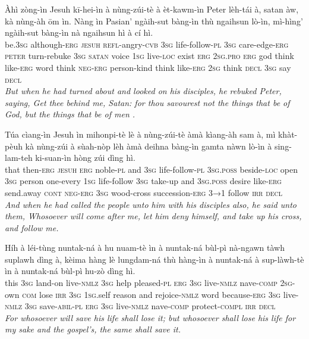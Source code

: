 \documentclass[11pt,a4paper]{article}
\begin{document}
\begin{exe}
\gll Àhì zòng-ìn Jesuh kī-hei-ìn à nùng-zúi-tè à èt-kawm-ìn Peter lèh-tái à, satan àw, kà nùng-àh ōm ìn. Nàng ìn Pasian' ngàih-sut bàng-ìn thù ngaihsun lò-ìn, mì-hìng' ngàih-sut bàng-ìn nà ngaihsun hì à cí hì. \\
     be.\textsc{3sg} although-\textsc{erg} \textsc{jesuh} \textsc{refl}-angry-\textsc{cvb} \textsc{3sg} life-follow-\textsc{pl} \textsc{3sg} care-edge-\textsc{erg} \textsc{peter} turn-rebuke \textsc{3sg} \textsc{satan} voice \textsc{1sg} live-\textsc{loc} exist \textsc{erg} \textsc{2sg}.\textsc{pro} \textsc{erg} god think like-\textsc{erg} word think \textsc{neg}-\textsc{erg} person-kind think like-\textsc{erg} \textsc{2sg} think \textsc{decl} \textsc{3sg} say \textsc{decl} \\
\glt \textcolor{kjvcolor}{\textit{But when he had turned about and looked on his disciples, he rebuked Peter, saying, Get thee behind me, Satan: for thou savourest not the things that be of God, but the things that be of men .}}

\gll Túa cìang-ìn Jesuh ìn mihonpi-tè lè à nùng-zúi-tè àmà kìang-àh sam à, mì khàt-pèuh kà nùng-zúi à sùah-nòp lèh àmà deihna bàng-ìn gamta nàwn lò-ìn à sing-lam-teh ki-suan-ìn hòng zúi dìng hì. \\
     that then-\textsc{erg} \textsc{jesuh} \textsc{erg} noble-\textsc{pl} and \textsc{3sg} life-follow-\textsc{pl} \textsc{3sg}.\textsc{poss} beside-\textsc{loc} open \textsc{3sg} person one-every \textsc{1sg} life-follow \textsc{3sg} take-up and \textsc{3sg}.\textsc{poss} desire like-\textsc{erg} send.away \textsc{cont} \textsc{neg}-\textsc{erg} \textsc{3sg} wood-cross succession-\textsc{erg} \textsc{3→1} follow \textsc{irr} \textsc{decl} \\
\glt \textcolor{kjvcolor}{\textit{And when he had called the people unto him with his disciples also, he said unto them, Whosoever will come after me, let him deny himself, and take up his cross, and follow me.}}

\gll Híh à léi-tùng nuntak-ná à hu nuam-tè ìn à nuntak-ná bùl-pì nà-ngawn tàwh suplawh dìng à, kèima hàng lè lungdam-ná thù hàng-ìn à nuntak-ná à sup-làwh-tè ìn à nuntak-ná bùl-pì hu-zò dìng hì. \\
     this \textsc{3sg} land-on live-\textsc{nmlz} \textsc{3sg} help pleased-\textsc{pl} \textsc{erg} \textsc{3sg} live-\textsc{nmlz} nave-\textsc{comp} \textsc{2sg}-own \textsc{com} lose \textsc{irr} \textsc{3sg} \textsc{1sg}.self reason and rejoice-\textsc{nmlz} word because-\textsc{erg} \textsc{3sg} live-\textsc{nmlz} \textsc{3sg} save-\textsc{abil}-\textsc{pl} \textsc{erg} \textsc{3sg} live-\textsc{nmlz} nave-\textsc{comp} protect-\textsc{compl} \textsc{irr} \textsc{decl} \\
\glt \textcolor{kjvcolor}{\textit{For whosoever will save his life shall lose it; but whosoever shall lose his life for my sake and the gospel's, the same shall save it.}}


\end{exe}
\end{document}
